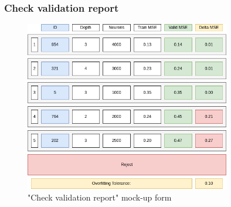 \subsubsection{Check validation report}

\begin{figure}[H]
\centering
\includegraphics[width=0.8\textwidth]{figures/check_validation_report.png}
\caption{"Check validation report" mock-up form}
\end{figure}

